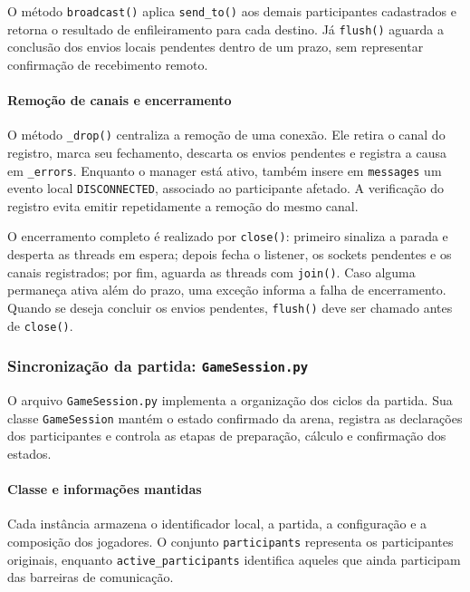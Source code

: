 \documentclass[11pt,a4paper]{article}
\begin{document}
O método \texttt{broadcast()} aplica \texttt{send\_to()} aos demais participantes cadastrados e retorna o resultado de enfileiramento para cada destino. Já \texttt{flush()} aguarda a conclusão dos envios locais pendentes dentro de um prazo, sem representar confirmação de recebimento remoto.

\paragraph{Remoção de canais e encerramento}

O método \texttt{\_drop()} centraliza a remoção de uma conexão. Ele retira o canal do registro, marca seu fechamento, descarta os envios pendentes e registra a causa em \texttt{\_errors}. Enquanto o manager está ativo, também insere em \texttt{messages} um evento local \texttt{DISCONNECTED}, associado ao participante afetado. A verificação do registro evita emitir repetidamente a remoção do mesmo canal.

O encerramento completo é realizado por \texttt{close()}: primeiro sinaliza a parada e desperta as threads em espera; depois fecha o listener, os sockets pendentes e os canais registrados; por fim, aguarda as threads com \texttt{join()}. Caso alguma permaneça ativa além do prazo, uma exceção informa a falha de encerramento. Quando se deseja concluir os envios pendentes, \texttt{flush()} deve ser chamado antes de \texttt{close()}.

\subsubsection{Sincronização da partida: \texttt{GameSession.py}}
\label{sec:implementacao-gamesession}

O arquivo \texttt{GameSession.py} implementa a organização dos ciclos da partida. Sua classe \texttt{GameSession} mantém o estado confirmado da arena, registra as declarações dos participantes e controla as etapas de preparação, cálculo e confirmação dos estados.

\paragraph{Classe e informações mantidas}

Cada instância armazena o identificador local, a partida, a configuração e a composição dos jogadores. O conjunto \texttt{participants} representa os participantes originais, enquanto \texttt{active\_participants} identifica aqueles que ainda participam das barreiras de comunicação.
\end{document}
